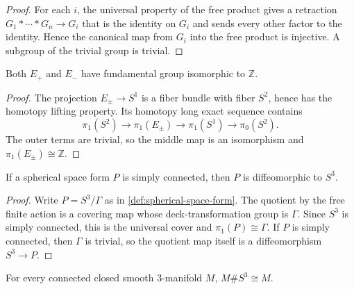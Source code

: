 \begin{proof}
For each $i$, the universal property of the free product gives a retraction
$G_1*\cdots*G_n\to G_i$ that is the identity on $G_i$ and sends every other
factor to the identity.  Hence the canonical map from $G_i$ into the free
product is injective.  A subgroup of the trivial group is trivial.
\end{proof}

\begin{lemma}
\label{lem:sphere-bundle-fundamental-group}
\notready
Both $E_+$ and $E_-$ have fundamental group isomorphic to $\mathbb Z$.
\end{lemma}

\begin{proof}
The projection $E_\pm\to S^1$ is a fiber bundle with fiber $S^2$, hence has
the homotopy lifting property.  Its homotopy long exact sequence contains
\[
 \pi_1(S^2)\longrightarrow\pi_1(E_\pm)
 \longrightarrow\pi_1(S^1)\longrightarrow\pi_0(S^2).
\]
The outer terms are trivial, so the middle map is an isomorphism and
$\pi_1(E_\pm)\cong\mathbb Z$.
\end{proof}

\begin{lemma}
\label{lem:simply-connected-spherical-space-form}
\notready
If a spherical space form $P$ is simply connected, then $P$ is diffeomorphic
to $S^3$.
\end{lemma}

\begin{proof}
Write $P=S^3/\Gamma$ as in \ref{def:spherical-space-form}.  The quotient by
the free finite action is a covering map whose deck-transformation group is
$\Gamma$.  Since $S^3$ is simply connected, this is the universal cover and
$\pi_1(P)\cong\Gamma$.  If $P$ is simply connected, then $\Gamma$ is trivial,
so the quotient map itself is a diffeomorphism $S^3\to P$.
\end{proof}

\begin{lemma}
\label{lem:three-sphere-connected-sum-identity}
\notready
For every connected closed smooth $3$-manifold $M$,
$M\#S^3\cong M$.
\end{lemma}

